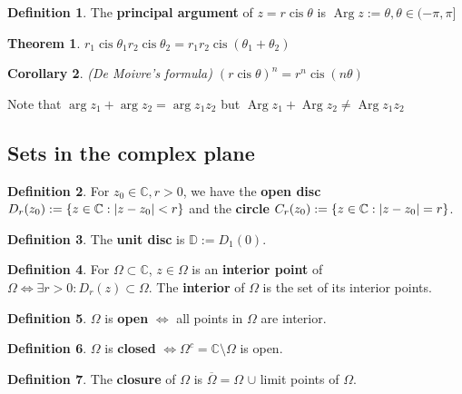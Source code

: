 \documentclass[12pt]{article}
\newtheorem{thm}{Theorem}[section]
\newtheorem{cor}[thm]{Corollary}
\theoremstyle{definition}
\newtheorem{defn}{Definition}[section]
\newcommand{\C}{\mathbb{C}}
\newcommand{\D}{\mathbb{D}}
\DeclarePairedDelimiter\abs{\lvert}{\rvert}
\DeclareMathOperator{\cis}{cis}
\DeclareMathOperator{\Arg}{Arg}
\begin{document}
\begin{defn}
  The \textbf{principal argument} of $z = r\cis{\theta}$ is $\Arg{z} := \theta, \theta \in (-\pi, \pi]$
\end{defn}

\begin{thm}
  $r_1\cis{\theta_1}r_2\cis{\theta_2} = r_1r_2\cis{(\theta_1 + \theta_2)}$
\end{thm}

\begin{cor}
  (De Moivre's formula)
  $(r\cis{\theta})^n = r^n\cis{(n\theta)}$
\end{cor}

Note that $\arg{z_1} + \arg{z_2} = \arg{z_1z_2}$ but $\Arg{z_1} + \Arg{z_2} \neq \Arg{z_1z_2}$

\subsection{Sets in the complex plane}

\begin{defn}
  For $z_0 \in \mathbb{C}, r > 0$, we have the \textbf{open disc} $D_r(z_0) := \{z \in \mathbb{C} : \abs{z - z_0} < r\}$ and the \textbf{circle} $C_r(z_0) := \{z \in \mathbb{C} : \abs{z - z_0} = r\}$.
\end{defn}

\begin{defn}
  The \textbf{unit disc} is $\D := D_1(0)$.
\end{defn}

\begin{defn}
  For $\Omega \subset \C$, $z \in \Omega$ is an \textbf{interior point} of $\Omega \iff \exists r > 0 : D_r(z) \subset \Omega$.
  The \textbf{interior} of $\Omega$ is the set of its interior points.
\end{defn}

\begin{defn}
  $\Omega$ is \textbf{open} $\iff$ all points in $\Omega$ are interior.
\end{defn}

\begin{defn}
  $\Omega$ is \textbf{closed} $\iff \Omega^c = \C \setminus \Omega$ is open.
\end{defn}

\begin{defn}
  The \textbf{closure} of $\Omega$ is $\overline{\Omega} = \Omega$ $\cup$ limit points of $\Omega$.
\end{defn}
\end{document}
